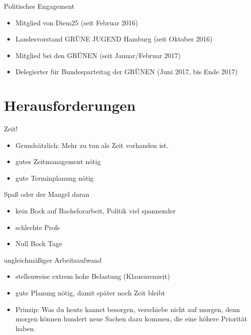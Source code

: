 \documentclass{beamer}
\begin{document}
\begin{frame}{Politisches Engagement}
    \begin{itemize}
        \item Mitglied von Diem25 (seit Februar 2016)
        \vfill
        \item Landesvorstand GRÜNE JUGEND Hamburg (seit Oktober 2016)
        \vfill
        \item Mitglied bei den GRÜNEN (seit Januar/Februar 2017)
        \vfill
        \item Delegierter für Bundesparteitag der GRÜNEN (Juni 2017, bis Ende 2017)
    \end{itemize}
\end{frame}

\section{Herausforderungen}
\begin{frame}{Zeit!}
    \begin{itemize}
        \item Grundsätzlich: Mehr zu tun als Zeit vorhanden ist.
        \vfill
        \item gutes Zeitmanagement nötig
        \vfill
        \item gute Terminplanung nötig
    \end{itemize}
\end{frame}

\begin{frame}{Spaß oder der Mangel daran}
    \begin{itemize}
        \item kein Bock auf Bachelorarbeit, Politik viel spannender
        \vfill
        \item schlechte Profs
        \vfill
        \item Null Bock Tage
    \end{itemize}
\end{frame}

\begin{frame}{ungleichmäßiger Arbeitsaufwand}
    \begin{itemize}
        \item stellenweise extrem hohe Belastung (Klausurenzeit)
        \vfill
        \item gute Planung nötig, damit später noch Zeit bleibt
        \vfill
        \item Prinzip: Was du heute kannst besorgen, verschiebe nicht auf morgen,
                       denn morgen können hundert neue Sachen dazu kommen, die eine
                       höhere Priorität haben.
    \end{itemize}
\end{frame}
\end{document}
